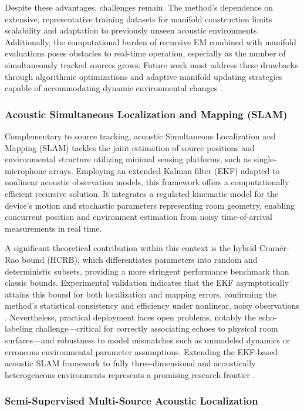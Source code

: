 \documentclass[sigconf]{acmart}
\begin{document}
Despite these advantages, challenges remain. The method's dependence on extensive, representative training datasets for manifold construction limits scalability and adaptation to previously unseen acoustic environments. Additionally, the computational burden of recursive EM combined with manifold evaluations poses obstacles to real-time operation, especially as the number of simultaneously tracked sources grows. Future work must address these drawbacks through algorithmic optimizations and adaptive manifold updating strategies capable of accommodating dynamic environmental changes \cite{ref38}.

\subsubsection{Acoustic Simultaneous Localization and Mapping (SLAM)}

Complementary to source tracking, acoustic Simultaneous Localization and Mapping (SLAM) tackles the joint estimation of source positions and environmental structure utilizing minimal sensing platforms, such as single-microphone arrays. Employing an extended Kalman filter (EKF) adapted to nonlinear acoustic observation models, this framework offers a computationally efficient recursive solution. It integrates a regulated kinematic model for the device's motion and stochastic parameters representing room geometry, enabling concurrent position and environment estimation from noisy time-of-arrival measurements in real time.

A significant theoretical contribution within this context is the hybrid Cramér-Rao bound (HCRB), which differentiates parameters into random and deterministic subsets, providing a more stringent performance benchmark than classic bounds. Experimental validation indicates that the EKF asymptotically attains this bound for both localization and mapping errors, confirming the method’s statistical consistency and efficiency under nonlinear, noisy observations \cite{ref39}. Nevertheless, practical deployment faces open problems, notably the echo-labeling challenge—critical for correctly associating echoes to physical room surfaces—and robustness to model mismatches such as unmodeled dynamics or erroneous environmental parameter assumptions. Extending the EKF-based acoustic SLAM framework to fully three-dimensional and acoustically heterogeneous environments represents a promising research frontier \cite{ref39}.

\subsubsection{Semi-Supervised Multi-Source Acoustic Localization}
\end{document}
